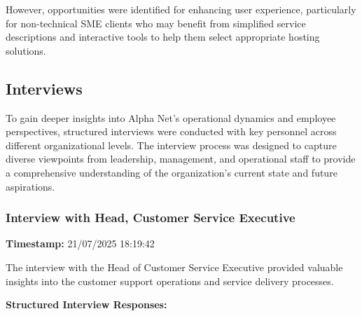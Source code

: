 However, opportunities were identified for enhancing user experience, particularly for non-technical SME clients who may benefit from simplified service descriptions and interactive tools to help them select appropriate hosting solutions.

\subsection{Interviews}
To gain deeper insights into Alpha Net's operational dynamics and employee perspectives, structured interviews were conducted with key personnel across different organizational levels. The interview process was designed to capture diverse viewpoints from leadership, management, and operational staff to provide a comprehensive understanding of the organization's current state and future aspirations.

\subsubsection*{Interview with Head, Customer Service Executive}
\textbf{Timestamp:} 21/07/2025 18:19:42

The interview with the Head of Customer Service Executive provided valuable insights into the customer support operations and service delivery processes.

\textbf{Structured Interview Responses:}

